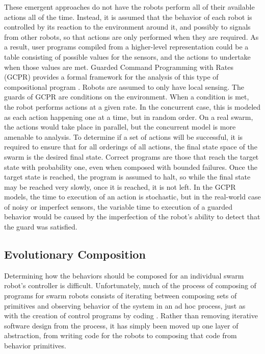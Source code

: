 These emergent approaches do not have the robots perform all of their available actions all of the time. 
Instead, it is assumed that the behavior of each robot is controlled by its reaction to the environment around it, and possibly to signals from other robots, so that actions are only performed when they are required. 
As a result, user programs compiled from a higher-level representation could be a table consisting of possible values for the sensors, and the actions to undertake when those values are met.
Guarded Command Programming with Rates (GCPR) provides a formal framework for the analysis of this type of compositional program \citep{napp2011compositional}. 
Robots are assumed to only have local sensing.
The guards of GCPR are conditions on the environment.
When a condition is met, the robot performs actions at a given rate. 
In the concurrent case, this is modeled as each action happening one at a time, but in random order. 
On a real swarm, the actions would take place in parallel, but the concurrent model is more amenable to analysis. 
To determine if a set of actions will be successful, it is required to ensure that for all orderings of all actions, the final state space of the swarm is the desired final state. 
Correct programs are those that reach the target state with probability one, even when composed with bounded failures. 
Once the target state is reached, the program is assumed to halt, so while the final state may be reached very slowly, once it is reached, it is not left. 
In the GCPR models, the time to execution of an action is stochastic, but in the real-world case of noisy or imperfect sensors, the variable time to execution of a guarded behavior would be caused by the imperfection of the robot's ability to detect that the guard was satisfied. 

\subsection{Evolutionary Composition} \label{section:Evolutionary_Composition}

Determining how the behaviors should be composed for an individual swarm robot's controller is difficult. 
Unfortunately, much of the process of composing of programs for swarm robots consists of iterating between composing sets of primitives and observing behavior of the system in an ad hoc process, just as with the creation of control programs by coding \citep{palmer2005behavioral}. 
Rather than removing iterative software design from the process, it has simply been moved up one layer of abstraction, from writing code for the robots to composing that code from behavior primitives. 

